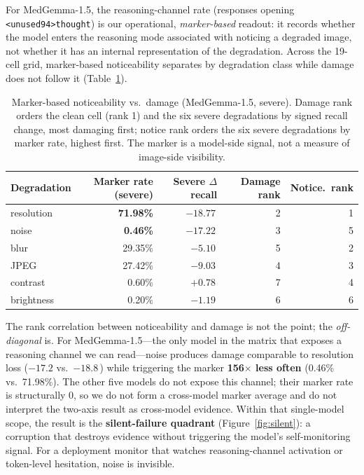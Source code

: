 For MedGemma-1.5, the reasoning-channel rate (responses opening \texttt{<unused94>thought}) is our operational, \emph{marker-based} readout: it records whether the model enters the reasoning mode associated with noticing a degraded image, not whether it has an internal representation of the degradation. Across the 19-cell grid, marker-based noticeability separates by degradation class while damage does not follow it (Table~\ref{tab:twoaxis}).

\begin{table}[t]
\centering
\small
\caption{Marker-based noticeability vs.\ damage (MedGemma-1.5, severe). Damage rank orders the clean cell (rank 1) and the six severe degradations by signed recall change, most damaging first; notice rank orders the six severe degradations by marker rate, highest first. The marker is a model-side signal, not a measure of image-side visibility.}
\label{tab:twoaxis}
\begin{tabular}{lrrrr}
\toprule
Degradation & Marker rate (severe) & Severe $\Delta$ recall & Damage rank & Notice.\ rank \\
\midrule
resolution & \textbf{71.98\%} & $-18.77$\,\pp{} & 2 & 1 \\
noise & \textbf{0.46\%} & $-17.22$\,\pp{} & 3 & 5 \\
blur & 29.35\% & $-5.10$\,\pp{} & 5 & 2 \\
JPEG & 27.42\% & $-9.03$\,\pp{} & 4 & 3 \\
contrast & 0.60\% & $+0.78$\,\pp{} & 7 & 4 \\
brightness & 0.20\% & $-1.19$\,\pp{} & 6 & 6 \\
\bottomrule
\end{tabular}
\end{table}

The rank correlation between noticeability and damage is not the point; the \emph{off-diagonal} is. For MedGemma-1.5---the only model in the matrix that exposes a reasoning channel we can read---noise produces damage comparable to resolution loss ($-17.2$ vs.\ $-18.8$\,\pp{}) while triggering the marker \textbf{156$\times$ less often} (0.46\% vs.\ 71.98\%). The other five models do not expose this channel; their marker rate is structurally 0, so we do not form a cross-model marker average and do not interpret the two-axis result as cross-model evidence. Within that single-model scope, the result is the \textbf{silent-failure quadrant} (Figure~\ref{fig:silent}): a corruption that destroys evidence without triggering the model's self-monitoring signal. For a deployment monitor that watches reasoning-channel activation or token-level hesitation, noise is invisible.

